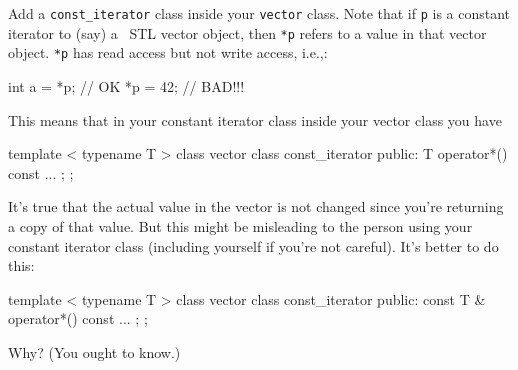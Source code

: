 Add a \verb!const_iterator! class inside your
\verb!vector! class.
Note that if \verb!p! is a constant iterator to (say)
a \cpp\ STL vector object, then
\verb!*p! refers to a value in that vector object.
\verb!*p! has read access but not write access, i.e.,:
\begin{console}[frame=single]
int a = *p; // OK
*p = 42;    // BAD!!!
\end{console}
This means that in your constant iterator class inside your vector class
you have
\begin{console}[frame=single,fontsize=\footnotesize]
template < typename T >
class vector
{
    class const_iterator
    {
    public:
        T operator*() const
        { ... }
    };
};
\end{console}
It's true that the actual value in the vector is not changed since
you're returning a copy of that value.
But this might be misleading to the person using your constant iterator class
(including yourself if you're not careful).
It's better to do this:
\begin{console}[frame=single,fontsize=\footnotesize]
template < typename T >
class vector
{
    class const_iterator
    {
    public:
        const T & operator*() const
        { ... }
    };
};
\end{console}
Why? (You ought to know.)
